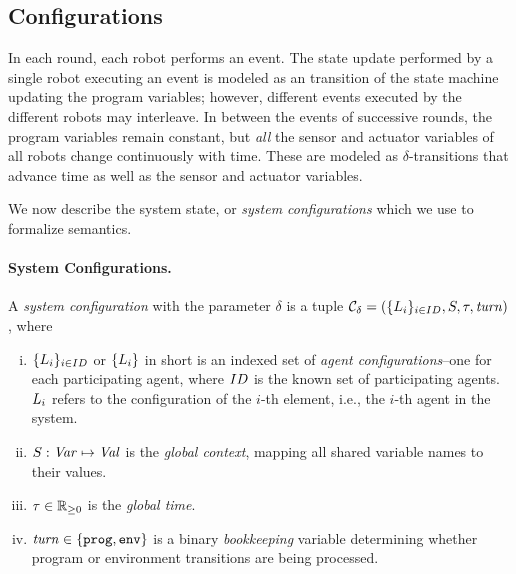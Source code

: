 \subsection{Configurations}\label{sec:configs}

In each round, each robot performs an event.
The state update performed by a single robot executing an event is modeled as an transition of the state machine updating the program variables;
however, different events executed by the different robots may interleave.
In between the events of successive rounds, the program variables remain constant,
but {\em all\/} the sensor and actuator variables of all robots change continuously with time.
These are modeled as $\delta$-transitions that advance time as well as the sensor and actuator variables.

%
%
%

We now describe the system state, or \emph{system configurations} which we use to formalize \lgname semantics.

\paragraph{System Configurations.}

A {\em system configuration\/} with the parameter $\delta$ is a tuple
$\mathcal{C}_\delta = (\{L_{i}\}_{i\in ID},{S},\tau,\mathit{turn})$, where

\begin{enumerate}[i)]
\item $\{L_{i}\}_{i\in ID}$ or $\{L_{i}\}$ in short is an indexed set of \emph{agent configurations}--one for each participating agent,
      where $ID$ is the known set of participating agents.
      $L_{i}$ refers to the configuration of the $i$-th element, i.e., the $i$-th agent in the system.
\item ${S} : \mathit{Var} \mapsto \mathit{Val}$ is the {\em global context\/}, mapping all shared variable names to their values.
\item $\tau\in \nnreals$ is the {\em global time\/}.
\item $\mathit{turn}\in\{\mathtt{prog,env}\}$ is a binary \emph{bookkeeping} variable determining whether  program or environment transitions are being processed.
\end{enumerate}

